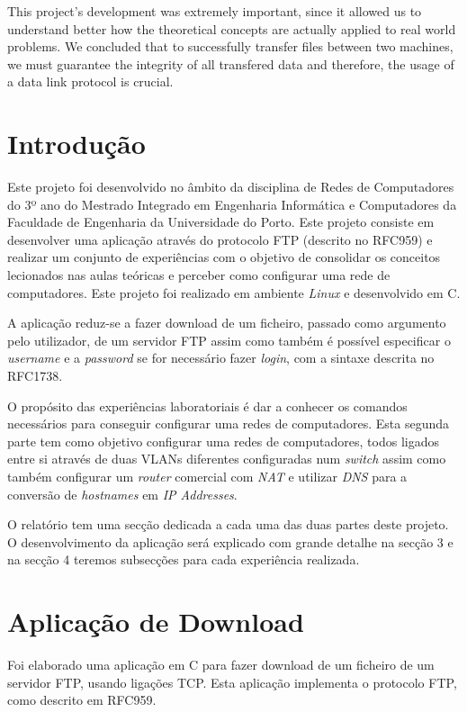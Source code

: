 \documentclass[a4paper]{article}
\begin{document}
This project's development was extremely important, since it allowed us to understand better how the theoretical concepts are actually applied to real world problems. We concluded that to successfully transfer files between two machines, we must guarantee the integrity of all transfered data and therefore, the usage of a data link protocol is crucial.


\section{Introdução}

Este projeto foi desenvolvido no âmbito da disciplina de Redes de Computadores do 3º ano do Mestrado Integrado em Engenharia Informática e Computadores da Faculdade de Engenharia da Universidade do Porto. Este projeto consiste em desenvolver uma aplicação através do protocolo FTP (descrito no RFC959) e realizar um conjunto de experiências com o objetivo de consolidar os conceitos lecionados nas aulas teóricas e perceber como configurar uma rede de computadores. Este projeto foi realizado em ambiente \textit{Linux} e desenvolvido em C.

A aplicação reduz-se a fazer download de um ficheiro, passado como argumento pelo utilizador, de um servidor FTP assim como também é possível especificar o \textit{username} e a \textit{password} se for necessário fazer \textit{login}, com a sintaxe descrita no RFC1738.

O propósito das experiências laboratoriais é dar a conhecer os comandos necessários para conseguir configurar uma redes de computadores. Esta segunda parte tem como objetivo configurar uma redes de computadores, todos ligados entre si através de duas VLANs diferentes configuradas num \textit{switch} assim como também configurar um \textit{router} comercial com \textit{NAT} e utilizar \textit{DNS} para a conversão de \textit{hostnames} em \textit{IP Addresses}.

O relatório tem uma secção dedicada a cada uma das duas partes deste projeto. O desenvolvimento da aplicação será explicado com grande detalhe na secção 3 e na secção 4 teremos subsecções para cada experiência realizada.

\section{Aplicação de Download}
Foi elaborado uma aplicação em C para fazer download de um ficheiro de um servidor FTP, usando ligações TCP. Esta aplicação implementa o protocolo FTP, como descrito em RFC959.
\end{document}
